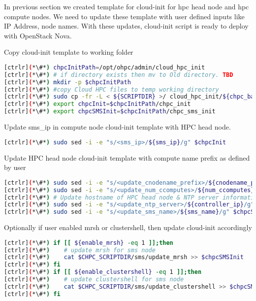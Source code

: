 In previous section we created template for cloud-init for hpc head node and hpc compute nodes. We need to update these template with user defined inputs like IP Address, node names. With these updates, cloud-init script is ready to deploy with OpenStack Nova.

Copy cloud-init template to working folder


\begin{lstlisting}[language=bash,keywords={}]
[ctrlr](*\#*) chpcInitPath=/opt/ohpc/admin/cloud_hpc_init
[ctrlr](*\#*) # if directory exists then mv to Old directory. TBD
[ctrlr](*\#*) mkdir -p $chpcInitPath
[ctrlr](*\#*) #copy Cloud HPC files to temp working directory
[ctrlr](*\#*) sudo cp -fr -L < ${SCRIPTDIR} >/ cloud_hpc_init/${chpc_base}/* $chpcInitPath/
[ctrlr](*\#*) export chpcInit=$chpcInitPath/chpc_init
[ctrlr](*\#*) export chpcSMSInit=$chpcInitPath/chpc_sms_init
\end{lstlisting}

Update sms\_ip in compute node cloud-init template with HPC head node. 
\begin{lstlisting}[language=bash,keywords={}]
[ctrlr](*\#*) sudo sed -i -e "s/<sms_ip>/${sms_ip}/g" $chpcInit
\end{lstlisting}

Update HPC head node cloud-init template with compute name prefix as defined by user

\begin{lstlisting}[language=bash,keywords={}]
[ctrlr](*\#*) sudo sed -i -e "s/<update_cnodename_prefix>/${cnodename_prefix}/g" $chpcSMSInit
[ctrlr](*\#*) sudo sed -i -e "s/<update_num_ccomputes>/${num_ccomputes}/g" $chpcSMSInit
[ctrlr](*\#*) # Update hostname of HPC head node & NTP server information
[ctrlr](*\#*) sudo sed -i -e "s/<update_ntp_server>/${controller_ip}/g" $chpcSMSInit
[ctrlr](*\#*) sudo sed -i -e "s/<update_sms_name>/${sms_name}/g" $chpcSMSInit
\end{lstlisting}

Optionally if user enabled mrsh or clustershell, then update cloud-init accordingly

\begin{lstlisting}[language=bash,keywords={}]
[ctrlr](*\#*) if [[ ${enable_mrsh} -eq 1 ]];then
[ctrlr](*\#*)    # update mrsh for sms node
[ctrlr](*\#*)    cat $CHPC_SCRIPTDIR/sms/update_mrsh >> $chpcSMSInit
[ctrlr](*\#*) fi
[ctrlr](*\#*) if [[ ${enable_clustershell} -eq 1 ]];then
[ctrlr](*\#*)    # update clustershell for sms node
[ctrlr](*\#*)    cat $CHPC_SCRIPTDIR/sms/update_clustershell >> $chpcSMSInit
[ctrlr](*\#*) fi
\end{lstlisting}

